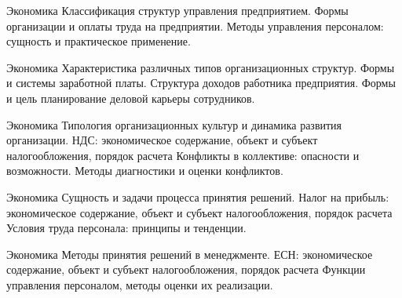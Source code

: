 \documentclass[
	11pt,
	a4paper,
	]
	{article}
\begin{document}
\vfill



\begin{minipage}[t][\miniH]{\miniL}\centering
	 {Экономика}
		{
			Классификация структур управления предприятием.
		}{
			Формы организации и оплаты труда на предприятии.
		}{
			Методы управления персоналом: сущность и практическое применение.
		}
	\lowGE
\end{minipage}

\vfill



\begin{minipage}[t][\miniH]{\miniL}\centering
	 {Экономика}
		{
			Характеристика различных типов организационных структур.
		}{
			Формы и системы заработной платы. Структура доходов работника предприятия.
		}{
			Формы и цель планирование деловой карьеры сотрудников.
		}
	\lowGE
\end{minipage}





\begin{minipage}[t][\miniH]{\miniL}\centering
	 {Экономика}
		{
			Типология организационных культур и динамика развития организации.
		}{
			НДС: экономическое содержание, объект и субъект налогообложения, порядок расчета
		}{
			Конфликты в коллективе: опасности и возможности. Методы диагностики и оценки конфликтов.
		}
	\lowGE
\end{minipage}

\vfill



\begin{minipage}[t][\miniH]{\miniL}\centering
	 {Экономика}
		{
			Сущность и задачи процесса принятия решений.
		}{
			Налог на прибыль: экономическое содержание, объект и субъект налогообложения, порядок расчета
		}{
			Условия труда персонала: принципы и тенденции.
		}
	\lowGE
\end{minipage}

\vfill



\begin{minipage}[t][\miniH]{\miniL}\centering
	 {Экономика}
		{
			Методы принятия решений в менеджменте.
		}{
			ЕСН: экономическое содержание, объект и субъект налогообложения, порядок расчета
		}{
			Функции управления персоналом, методы оценки их реализации.
		}
	\lowGE
\end{minipage}
\end{document}
